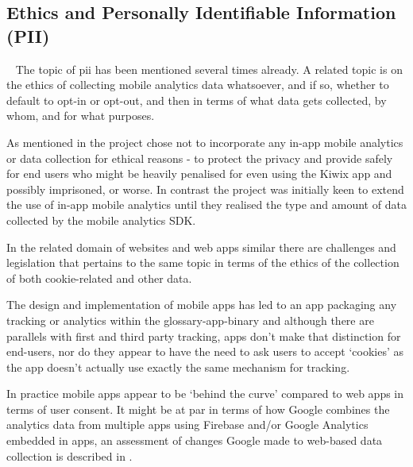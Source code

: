 \subsection{Ethics and Personally Identifiable Information (PII)}~\label{aiu-ethics-and-pii-topics}
The topic of \Gls{pii} has been mentioned several times already. A related topic is on the ethics of collecting mobile analytics data whatsoever, and if so, whether to default to opt-in or opt-out, and then in terms of what data gets collected, by whom, and for what purposes. 

As mentioned in  the  project chose not to incorporate any in-app mobile analytics or data collection for ethical reasons - to protect the privacy and provide safely for end users who might be heavily penalised for even using the Kiwix app and possibly imprisoned, or worse. In contrast the  project was initially keen to extend the use of in-app mobile analytics until they realised the type and amount of data collected by the mobile analytics SDK. 

\begin{kaobox}[frametitle=Comparisons with the `web']
In the related domain of websites and web apps similar there are challenges and legislation that pertains to the same topic in terms of the ethics of the collection of both cookie-related and other data.

The design and implementation of mobile apps has led to an app packaging any tracking or analytics within the \gls{glossary-app-binary} and although there are parallels with first and third party tracking, apps don't make that distinction for end-users, nor do they appear to have the need to ask users to accept `cookies' as the app doesn't actually use exactly the same mechanism for tracking.

In practice mobile apps appear to be `behind the curve' compared to web apps in terms of user consent. It might be at par in terms of how Google combines the analytics data from multiple apps using Firebase and/or Google Analytics embedded in apps, an assessment of changes Google made to web-based data collection is described in .
\end{kaobox}

